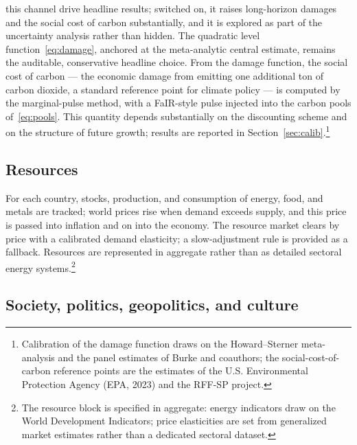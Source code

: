 \documentclass[a4paper,fleqn]{cas-sc}
\newcommand{\response}[1]{\medskip\noindent\textcolor{blue}{\small\itshape [Addressed: #1]}\medskip}
\begin{document}
this channel drive headline results; switched on, it raises long-horizon damages and the social
cost of carbon substantially, and it is explored as part of the uncertainty analysis rather than
hidden. The quadratic level function~\eqref{eq:damage}, anchored at the meta-analytic central
estimate, remains the auditable, conservative headline choice. From the damage function, the
social cost of carbon --- the economic damage from emitting one additional ton of carbon dioxide,
a standard reference point for climate policy --- is computed by the marginal-pulse method, with a
FaIR-style pulse injected into the carbon pools of~\eqref{eq:pools}. This quantity depends
substantially on the discounting scheme and on the structure of future growth; results are
reported in Section~\ref{sec:calib}.\footnote{Calibration of the damage function draws on the Howard--Sterner
meta-analysis and the panel estimates of Burke and coauthors; the social-cost-of-carbon reference
points are the estimates of the U.S. Environmental Protection Agency (EPA, 2023) and the RFF-SP
project.}

\subsection{Resources}

For each country, stocks, production, and consumption of energy, food, and metals are tracked; world
prices rise when demand exceeds supply, and this price is passed into inflation and on into the
economy. The resource market clears by price with a calibrated demand elasticity; a slow-adjustment
rule is provided as a fallback. Resources are represented in aggregate rather than as detailed
sectoral energy systems.\footnote{The resource block is specified in aggregate: energy indicators
draw on the World Development Indicators; price elasticities are set from generalized market
estimates rather than a dedicated sectoral dataset.}

\subsection{Society, politics, geopolitics, and culture}

\end{document}
